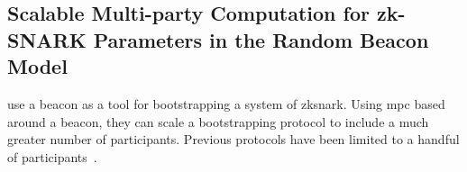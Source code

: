 \subsection{Scalable Multi-party Computation for zk-SNARK Parameters in the Random Beacon Model}%
\label{sub:scalable_mpc_zk_snarks}
\citet{mpcsnarks} use a beacon as a tool for bootstrapping a system of \gls{zksnark}.
Using \gls{mpc} based around a beacon, they can scale a bootstrapping protocol to include a much greater number of participants.
Previous protocols have been limited to a handful of participants~\cite{snarkparameters}.
